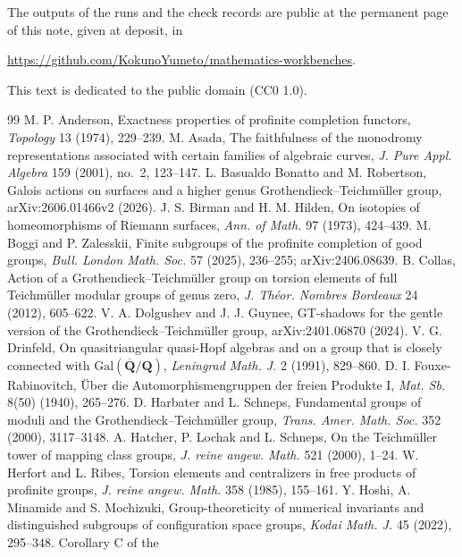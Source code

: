 \documentclass[11pt,a4paper]{article}
\theoremstyle{plain}
\theoremstyle{definition}
\theoremstyle{remark}
\newcommand{\recordurl}{https://github.com/KokunoYumeto/mathematics-workbenches}
\begin{document}
The outputs of the runs and the check records are public at the permanent page of this note, given at deposit,
in

{\raggedright\smallskip\noindent\url{\recordurl}.\par}

\smallskip
This text is dedicated to the public domain (CC0 1.0).

\begin{thebibliography}{99}\small
{} M. P. Anderson, Exactness properties of profinite completion functors, \emph{Topology} 13 (1974),
229--239.
 M. Asada, The faithfulness of the monodromy representations associated with certain families of
algebraic curves, \emph{J. Pure Appl. Algebra} 159 (2001), no.~2, 123--147.
 L. Basualdo Bonatto and M. Robertson, Galois actions on surfaces and a higher genus
Grothendieck--Teichm\"uller group, arXiv:2606.01466v2 (2026).
 J. S. Birman and H. M. Hilden, On isotopies of homeomorphisms of Riemann surfaces, \emph{Ann. of Math.}
97 (1973), 424--439.
 M. Boggi and P. Zalesskii, Finite subgroups of the profinite completion of good groups, \emph{Bull.
London Math. Soc.} 57 (2025), 236--255; arXiv:2406.08639.
 B. Collas, Action of a Grothendieck--Teichm\"uller group on torsion elements of full Teichm\"uller
modular groups of genus zero, \emph{J. Th\'eor. Nombres Bordeaux} 24 (2012), 605--622.
 V. A. Dolgushev and J. J. Guynee, GT-shadows for the gentle version of the Grothendieck--Teichm\"uller
group, arXiv:2401.06870 (2024).
 V. G. Drinfeld, On quasitriangular quasi-Hopf algebras and on a group that is closely connected with
$\mathrm{Gal}(\overline{\mathbf Q}/\mathbf Q)$, \emph{Leningrad Math. J.} 2 (1991), 829--860.
 D. I. Fouxe-Rabinovitch, \"Uber die Automorphismengruppen der freien Produkte I, \emph{Mat. Sb.} 8(50)
(1940), 265--276.
 D. Harbater and L. Schneps, Fundamental groups of moduli and the Grothendieck--Teichm\"uller group,
\emph{Trans. Amer. Math. Soc.} 352 (2000), 3117--3148.
 A. Hatcher, P. Lochak and L. Schneps, On the Teichm\"uller tower of mapping class groups, \emph{J.
reine angew. Math.} 521 (2000), 1--24.
 W. Herfort and L. Ribes, Torsion elements and centralizers in free products of profinite groups,
\emph{J. reine angew. Math.} 358 (1985), 155--161.
 Y. Hoshi, A. Minamide and S. Mochizuki, Group-theoreticity of numerical invariants and distinguished
subgroups of configuration space groups, \emph{Kodai Math. J.} 45 (2022), 295--348. Corollary C of the

\end{thebibliography}
\end{document}
